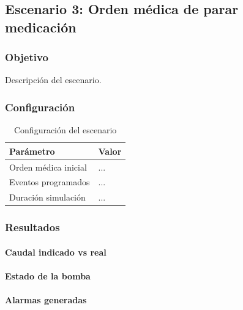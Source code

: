 \subsection{Escenario 3: Orden médica de parar medicación}

\subsubsection{Objetivo}

Descripción del escenario.

\subsubsection{Configuración}

\begin{table}[H]
\centering
\begin{tabular}{ll}
\toprule
Parámetro & Valor \\
\midrule
Orden médica inicial & ... \\
Eventos programados & ... \\
Duración simulación & ... \\
\bottomrule
\end{tabular}
\caption{Configuración del escenario}
\end{table}

\subsubsection{Resultados}

\paragraph{Caudal indicado vs real}


\paragraph{Estado de la bomba}


\paragraph{Alarmas generadas}

